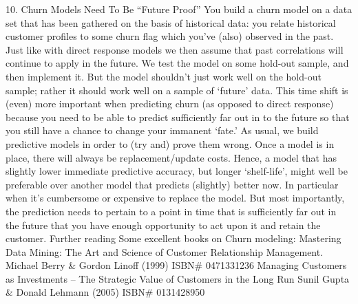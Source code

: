 10. Churn Models Need To Be “Future Proof”
You build a churn model on a data set that has been gathered on the basis of historical data: you relate historical customer profiles to some churn flag which you’ve (also) observed in the past. Just like with direct response models we then assume that past correlations will continue to apply in the future. We test the model on some hold-out sample, and then implement it. But the model shouldn’t just work well on the hold-out sample; rather it should work well on a sample of ‘future’ data. This time shift is (even) more important when predicting churn (as opposed to direct response) because you need to be able to predict sufficiently far out in to the future so that you still have a chance to change your immanent ‘fate.’ As usual, we build predictive models in order to (try and) prove them wrong.
Once a model is in place, there will always be replacement/update costs. Hence, a model that has slightly lower immediate predictive accuracy, but longer ‘shelf-life’, might well be preferable over another model that predicts (slightly) better now. In particular when it’s cumbersome or expensive to replace the model. But most importantly, the prediction needs to pertain to a point in time that is sufficiently far out in the future that you have enough opportunity to act upon it and retain the customer.
Further reading
Some excellent books on Churn modeling:
Mastering Data Mining: The Art and Science of Customer Relationship Management.  
Michael Berry & Gordon Linoff (1999) 
ISBN# 0471331236
Managing Customers as Investments – The Strategic Value of Customers in the Long Run  
Sunil Gupta & Donald Lehmann (2005) 
ISBN# 0131428950
